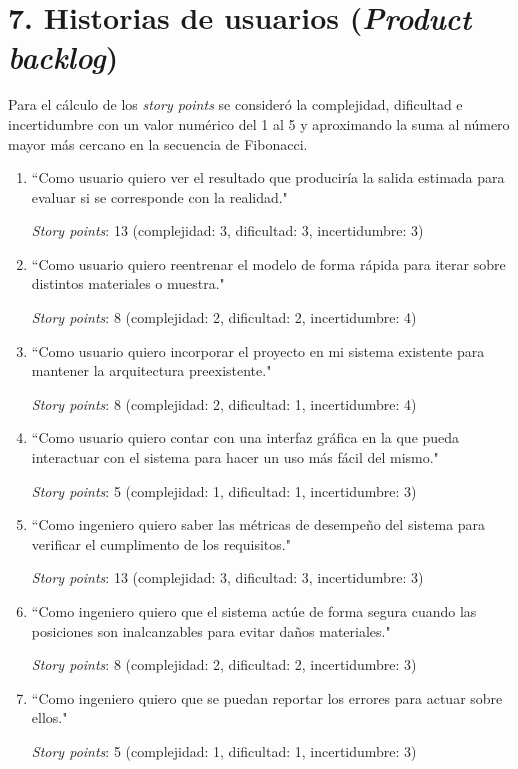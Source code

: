 \documentclass[
11pt, %
]{charter}
\begin{document}
\section{7. Historias de usuarios (\textit{Product backlog})}
\label{sec:backlog}

Para el cálculo de los \textit{story points} se consideró la complejidad, dificultad e incertidumbre con un valor numérico del 1 al 5 y aproximando la suma al número mayor más cercano en la secuencia de Fibonacci.

\begin{enumerate}
\item ``Como usuario quiero ver el resultado que produciría la salida estimada para evaluar si se corresponde con la realidad."

\textit{Story points}: 13 (complejidad: 3, dificultad: 3, incertidumbre: 3)

\item ``Como usuario quiero reentrenar el modelo de forma rápida para iterar sobre distintos materiales o muestra."

\textit{Story points}: 8 (complejidad: 2, dificultad: 2, incertidumbre: 4)

\item ``Como usuario quiero incorporar el proyecto en mi sistema existente para mantener la arquitectura preexistente."

\textit{Story points}: 8 (complejidad: 2, dificultad: 1, incertidumbre: 4)

\item ``Como usuario quiero contar con una interfaz gráfica en la que pueda interactuar con el sistema para hacer un uso más fácil del mismo."

\textit{Story points}: 5 (complejidad: 1, dificultad: 1, incertidumbre: 3)

\item ``Como ingeniero quiero saber las métricas de desempeño del sistema para verificar el cumplimento de los requisitos."

\textit{Story points}: 13 (complejidad: 3, dificultad: 3, incertidumbre: 3)

\item ``Como ingeniero quiero que el sistema actúe de forma segura cuando las posiciones son inalcanzables para evitar daños materiales."

\textit{Story points}: 8 (complejidad: 2, dificultad: 2, incertidumbre: 3)

\item ``Como ingeniero quiero que se puedan reportar los errores para actuar sobre ellos."

\textit{Story points}: 5 (complejidad: 1, dificultad: 1, incertidumbre: 3)

\end{enumerate}
\end{document}

